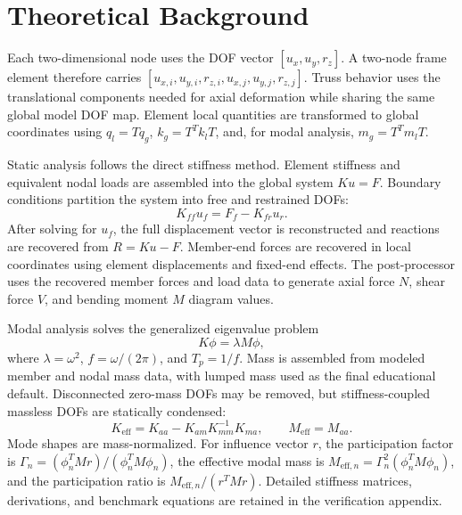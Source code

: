 \section{Theoretical Background}

Each two-dimensional node uses the DOF vector \([u_x,u_y,r_z]\). A two-node frame element therefore carries \([u_{x,i},u_{y,i},r_{z,i},u_{x,j},u_{y,j},r_{z,j}]\). Truss behavior uses the translational components needed for axial deformation while sharing the same global model DOF map. Element local quantities are transformed to global coordinates using \(q_l=Tq_g\), \(k_g=T^Tk_lT\), and, for modal analysis, \(m_g=T^Tm_lT\).

Static analysis follows the direct stiffness method. Element stiffness and equivalent nodal loads are assembled into the global system \(Ku=F\). Boundary conditions partition the system into free and restrained DOFs:
\[
K_{ff}u_f=F_f-K_{fr}u_r .
\]
After solving for \(u_f\), the full displacement vector is reconstructed and reactions are recovered from \(R=Ku-F\). Member-end forces are recovered in local coordinates using element displacements and fixed-end effects. The post-processor uses the recovered member forces and load data to generate axial force \(N\), shear force \(V\), and bending moment \(M\) diagram values.

Modal analysis solves the generalized eigenvalue problem
\[
K\phi=\lambda M\phi ,
\]
where \(\lambda=\omega^2\), \(f=\omega/(2\pi)\), and \(T_p=1/f\). Mass is assembled from modeled member and nodal mass data, with lumped mass used as the final educational default. Disconnected zero-mass DOFs may be removed, but stiffness-coupled massless DOFs are statically condensed:
\[
K_{\mathrm{eff}}=K_{aa}-K_{am}K_{mm}^{-1}K_{ma}, \qquad M_{\mathrm{eff}}=M_{aa}.
\]
Mode shapes are mass-normalized. For influence vector \(r\), the participation factor is \(\Gamma_n=(\phi_n^TMr)/(\phi_n^TM\phi_n)\), the effective modal mass is \(M_{\mathrm{eff},n}=\Gamma_n^2(\phi_n^TM\phi_n)\), and the participation ratio is \(M_{\mathrm{eff},n}/(r^TMr)\). Detailed stiffness matrices, derivations, and benchmark equations are retained in the verification appendix.
